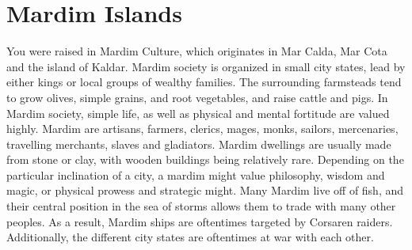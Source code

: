 \section{Mardim Islands}\label{culture:mardim}
You were raised in Mardim Culture, which originates in Mar Calda, Mar Cota and the island of Kaldar.
Mardim society is organized in small city states, lead by either kings or local groups of wealthy families.
The surrounding farmsteads tend to grow olives, simple grains, and root vegetables, and raise cattle and pigs.
In Mardim society, simple life, as well as physical and mental fortitude are valued highly.
Mardim are artisans, farmers, clerics, mages, monks, sailors, mercenaries, travelling merchants, slaves and gladiators.
Mardim dwellings are usually made from stone or clay, with wooden buildings being relatively rare.
Depending on the particular inclination of a city, a mardim might value philosophy, wisdom and magic, or physical prowess and strategic might.
Many Mardim live off of fish, and their central position in the sea of storms allows them to trade with many other peoples.
As a result, Mardim ships are oftentimes targeted by Corsaren raiders.
Additionally, the different city states are oftentimes at war with each other.